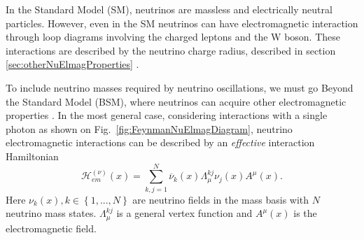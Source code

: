 
In the Standard Model (SM), neutrinos are massless and electrically neutral particles. However, even in the SM neutrinos can have electromagnetic interaction through loop diagrams involving the charged leptons and the W boson. These interactions are described by the neutrino charge radius, described in section \ref{sec:otherNuElmagProperties} \cite{NeutrinoPropertiesSnowmass2022.pdf}.


To include neutrino masses required by neutrino oscillations, we must go Beyond the Standard Model (BSM), where neutrinos can acquire other electromagnetic properties \cite{nuElmagInt2015.pdf}. In the most general case, considering interactions with a single photon as shown on Fig.~\ref{fig:FeynmanNuElmagDiagram}, neutrino electromagnetic interactions can be described by an \textit{effective} interaction Hamiltonian \cite{nuElmagInt2015.pdf}
\begin{equation}
\mathcal{H}^{\left(\nu\right)}_{em}\left(x\right)=\sum^N_{k,j=1}\overline{\nu}_k\left(x\right)\Lambda^{kj}_{\mu}\nu_j\left(x\right)A^{\mu}\left(x\right).
\end{equation}
Here $\nu_k\left(x\right), k\in\left\lbrace 1,...,N\right\rbrace$ are neutrino fields in the mass basis with $N$ neutrino mass states. $\Lambda^{kj}_{\mu}$ is a general vertex function and $A^{\mu}\left(x\right)$ is the electromagnetic field.

